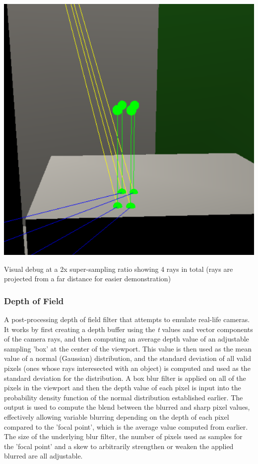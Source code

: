 \documentclass{article}
\begin{document}
    \begin{center}
      \includegraphics[scale=0.75]{images/supersampling_debugger.png}

      Visual debug at a 2x super-sampling ratio showing 4 rays in total (rays are projected from a far 
      distance for easier demonstration)
    \end{center}

    \subsubsection{Depth of Field}
    A post-processing depth of field filter that attempts to emulate real-life cameras. It works by first
    creating a depth buffer using the \emph{t} values and vector components of the camera rays, and then computing an
    average depth value of an adjustable sampling 'box' at the center of the viewport. This value is then
    used as the mean value of a normal (Gaussian) distribution, and the standard deviation of all valid
    pixels (ones whose rays interesected with an object) is computed and used as the standard deviation
    for the distribution. A box blur filter is applied on all of the pixels in the viewport and then
    the depth value of each pixel is input into the probability density function of the normal distribution
    established earlier. The output is used to compute the blend between the blurred and sharp pixel values,
    effectively allowing variable blurring depending on the depth of each pixel compared to the 'focal point',
    which is the average value computed from earlier. The size of the underlying blur filter, the number of
    pixels used as samples for the 'focal point' and a skew to arbitrarily strengthen or weaken the applied blurred
    are all adjustable.
\end{document}
